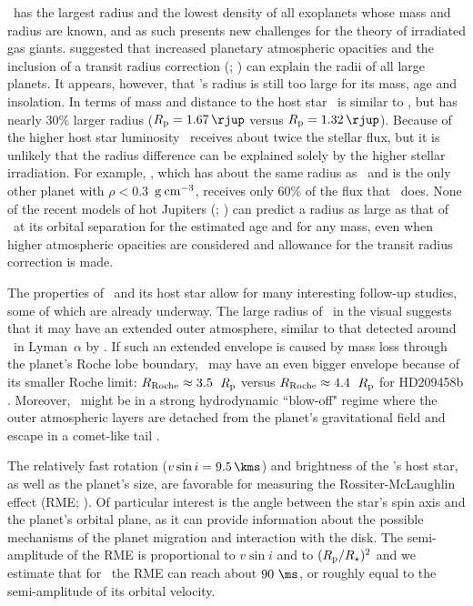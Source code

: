 \tresFour\ has the largest radius and the lowest density of all exoplanets whose
mass and radius are known, and as such presents new challenges for the theory
of irradiated gas giants. \citet{Burrows_Hubeny_Budaj:apj:2007a} suggested that increased planetary atmospheric opacities and the inclusion of a transit radius correction
(\citealp{Baraffe_Chabrier_Barman:aa:2003a}; \citealp*{Burrows_Sudarsky_Hubbard:apj:2003a}) can explain the radii of all large planets. It appears,
however, that \tresFour's radius is still too large for its mass, age and
insolation. In terms of mass and distance to the host star \tresFour\ is similar
to \hdTZN, but has nearly 30\% larger radius ($R_{\rm p} = 1.67\,\rjup$ versus $R_{\rm p} = 1.32\,\rjup$). Because of the higher host star luminosity \tresFour\ receives about twice the stellar flux, but it is unlikely that the radius difference can be explained solely by the higher stellar
irradiation. For example, \hatponeb, which has about the same radius as
\hdTZN\ and is the only other planet with $\rho < 0.3$~${\rm g \: cm^{-3}}$,
receives only 60\% of the flux that \hdTZN\ does. None of the recent models
of hot Jupiters (\citealp*[e.g.,][]{Fortney_Marley_Barnes:apj:2007a}; \citealp{Burrows_Hubeny_Budaj:apj:2007a}) can predict a radius as
large as that of \tresFour\ at its orbital separation for the estimated age and
for any mass, even when higher atmospheric opacities are considered and
allowance for the transit radius correction is made.

The properties of \tresFour\ and its host star allow for many interesting follow-up
studies, some of which are already underway. The large radius of \tresFour\ in the
visual suggests that it may have an extended outer atmosphere, similar to that
detected around \hdTZN\ in Lyman~$\alpha$ by \citet{Vidal-Madjar_Lecavelier-des-Etangs_Desert:nat:2003a}. If such an
extended envelope is caused by mass loss through the planet's Roche lobe
boundary, \tresFour\ may have an even bigger envelope because of its smaller
Roche limit: $R_{\rm Roche} \approx 3.5$~$R_{\rm p}$ versus
$R_{\rm Roche} \approx 4.4$~$R_{\rm p}$ for HD209458b \citep{Erkaev_Lammer_Kulikov:preprint:2007a}.
Moreover, \tresFour\ might be in a strong hydrodynamic ``blow-off" regime where the
outer atmospheric layers are detached from the planet's gravitational field and
escape in a comet-like tail \citep{Vidal-Madjar_Lecavelier-des-Etangs_Desert:nat:2003a, Lecavelier-des-Etangs_Vidal-Madjar_McConnell:aa:2004a}.

The relatively fast rotation ($v \sin i = 9.5 \, \kms$) and brightness of the
\tresFour's host star, as well as the planet's size, are favorable for measuring
the Rossiter-McLaughlin effect (RME; \citealp[see, e.g.,][]{Gaudi_Winn:apj:2007a}). Of
particular interest is the angle between the star's spin axis and the planet's
orbital plane, as it can provide information about the possible mechanisms of
the planet migration and interaction with the disk. The semi-amplitude of the
RME is proportional to $v \sin i$ and to $(R_{\rm p} / R_{\star})^2$ and we
estimate that for \tresFour\ the RME can reach about $90~\ms$, or roughly equal to
the semi-amplitude of its orbital velocity.
